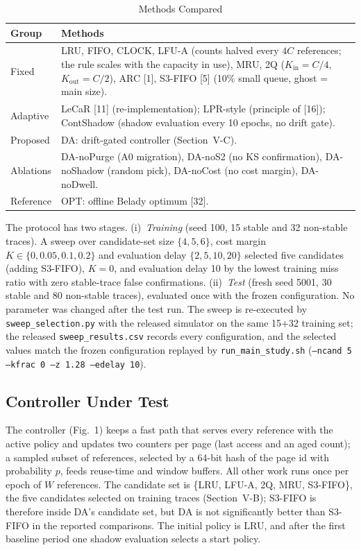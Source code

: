 \documentclass[10pt,twocolumn,a4paper]{IEEEtran}
\begin{document}
\begin{table}[!t]
\caption{Methods Compared}
\label{tab:methods}
\footnotesize
\begin{tabular}{@{}p{}p{}@{}}
\toprule
Group & Methods \\
\midrule
Fixed & LRU, FIFO, CLOCK, LFU-A (counts halved every $4C$ references; the rule scales with the capacity in use), MRU, 2Q ($K_{\mathrm{in}} = C/4$, $K_{\mathrm{out}} = C/2$), ARC [1], S3-FIFO [5] (10\% small queue, ghost = main size). \\
Adaptive & LeCaR [11] (re-implementation); LPR-style (principle of [16]); ContShadow (shadow evaluation every 10 epochs, no drift gate). \\
Proposed & DA: drift-gated controller (Section~V-C). \\
Ablations & DA-noPurge (A0 migration), DA-noS2 (no KS confirmation), DA-noShadow (random pick), DA-noCost (no cost margin), DA-noDwell. \\
Reference & OPT: offline Belady optimum [32]. \\
\bottomrule
\end{tabular}
\end{table}

The protocol has two stages. (i)~\emph{Training} (seed 100, 15 stable and 32
non-stable traces). A sweep over candidate-set size $\{4,5,6\}$, cost margin
$K \in \{0, 0.05, 0.1, 0.2\}$ and evaluation delay $\{2,5,10,20\}$ selected
five candidates (adding S3-FIFO), $K = 0$, and evaluation delay 10 by the lowest
training miss ratio with zero stable-trace false confirmations. (ii)~\emph{Test}
(fresh seed 5001, 30 stable and 80 non-stable traces), evaluated once with the
frozen configuration. No parameter was changed after the test run. The sweep is
re-executed by \texttt{sweep\_selection.py} with the released simulator on the
same 15+32 training set; the released \texttt{sweep\_results.csv} records every
configuration, and the selected values match the frozen configuration replayed
by \texttt{run\_main\_study.sh}
(\texttt{--ncand 5 --kfrac 0 --z 1.28 --edelay 10}).

\subsection{Controller Under Test}

The controller (Fig.~1) keeps a fast path that serves every reference with the
active policy and updates two counters per page (last access and an aged
count); a sampled subset of references, selected by a 64-bit hash of the page
id with probability $p$, feeds reuse-time and window buffers. All other work
runs once per epoch of $W$ references. The candidate set is
\{LRU, LFU-A, 2Q, MRU, S3-FIFO\}, the five candidates selected on training traces
(Section~V-B); S3-FIFO is therefore inside DA's candidate set, but DA is not
significantly better than S3-FIFO in the reported comparisons. The initial
policy is LRU, and after the first baseline period one shadow evaluation
selects a start policy.
\end{document}
